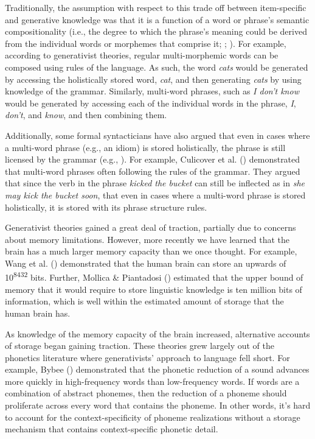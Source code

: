 \documentclass[
  12pt,
]{scrartcl}
\begin{document}
Traditionally, the assumption with respect to this trade off between
item-specific and generative knowledge was that it is a function of a
word or phrase's semantic compositionality (i.e., the degree to which
the phrase's meaning could be derived from the individual words or
morphemes that comprise it;
;
). For
example, according to generativist theories, regular multi-morphemic
words can be composed using rules of the language. As such, the word
\emph{cats} would be generated by accessing the holistically stored
word, \emph{cat}, and then generating \emph{cats} by using knowledge of
the grammar. Similarly, multi-word phrases, such as \emph{I don't know}
would be generated by accessing each of the individual words in the
phrase, \emph{I}, \emph{don't}, and \emph{know}, and then combining
them.

Additionally, some formal syntacticians have also argued that even in
cases where a multi-word phrase (e.g., an idiom) is stored holistically,
the phrase is still licensed by the grammar (e.g.,
). For example, Culicover et al.
()
demonstrated that multi-word phrases often following the rules of the
grammar. They argued that since the verb in the phrase \emph{kicked the
bucket} can still be inflected as in \emph{she may kick the bucket
soon}, that even in cases where a multi-word phrase is stored
holistically, it is stored with its phrase structure rules.

Generativist theories gained a great deal of traction, partially due to
concerns about memory limitations. However, more recently we have
learned that the brain has a much larger memory capacity than we once
thought. For example, Wang et al.
() demonstrated
that the human brain can store an upwards of 10\textsuperscript{8432}
bits. Further, Mollica \& Piantadosi
() estimated that
the upper bound of memory that it would require to store linguistic
knowledge is ten million bits of information, which is well within the
estimated amount of storage that the human brain has.

As knowledge of the memory capacity of the brain increased, alternative
accounts of storage began gaining traction. These theories grew largely
out of the phonetics literature where generativists' approach to
language fell short. For example, Bybee
() demonstrated that
the phonetic reduction of a sound advances more quickly in
high-frequency words than low-frequency words. If words are a
combination of abstract phonemes, then the reduction of a phoneme should
proliferate across every word that contains the phoneme. In other words,
it's hard to account for the context-specificity of phoneme realizations
without a storage mechanism that contains context-specific phonetic
detail.
\end{document}
